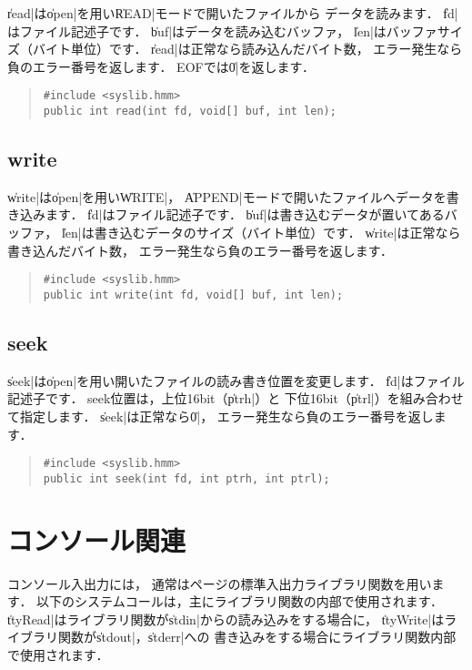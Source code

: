 \|read|は\|open|を用い\|READ|モードで開いたファイルから
データを読みます．
\|fd|はファイル記述子です．
\|buf|はデータを読み込むバッファ，
\|len|はバッファサイズ（バイト単位）です．
\|read|は正常なら読み込んだバイト数，
エラー発生なら負のエラー番号を返します．
EOFでは\|0|を返します．

\begin{quote}
\begin{verbatim}
#include <syslib.hmm>
public int read(int fd, void[] buf, int len);
\end{verbatim}
\end{quote}

\subsection{write}

\|write|は\|open|を用い\|WRITE|，
\|APPEND|モードで開いたファイルへデータを書き込みます．
\|fd|はファイル記述子です．
\|buf|は書き込むデータが置いてあるバッファ，
\|len|は書き込むデータのサイズ（バイト単位）です．
\|write|は正常なら書き込んだバイト数，
エラー発生なら負のエラー番号を返します．

\begin{quote}
\begin{verbatim}
#include <syslib.hmm>
public int write(int fd, void[] buf, int len);
\end{verbatim}
\end{quote}

\subsection{seek}

\|seek|は\|open|を用い開いたファイルの読み書き位置を変更します．
\|fd|はファイル記述子です．
seek位置は，上位16bit（\|ptrh|）と
下位16bit（\|ptrl|）を組み合わせて指定します．
\|seek|は正常なら\|0|，
エラー発生なら負のエラー番号を返します．

\begin{quote}
\begin{verbatim}
#include <syslib.hmm>
public int seek(int fd, int ptrh, int ptrl);
\end{verbatim}
\end{quote}

\section{コンソール関連}

コンソール入出力には，
通常は\pageref{chap4:stdio}ページの標準入出力ライブラリ関数を用います．
以下のシステムコールは，主にライブラリ関数の内部で使用されます．
\|ttyRead|はライブラリ関数が\|stdin|からの読み込みをする場合に，
\|ttyWrite|はライブラリ関数が\|stdout|，\|stderr|への
書き込みをする場合にライブラリ関数内部で使用されます．

